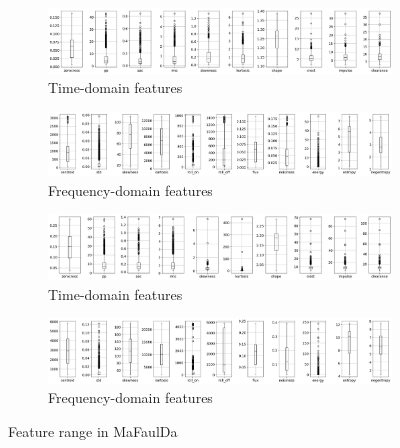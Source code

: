 \begin{figure}[h]
    \centering
    \begin{subfigure}[b]{0.48\textwidth}
        \includegraphics[width=\textwidth]{assets/results/feature-values/features-TD-dim1-A.png}
        \caption{Time-domain features}
    \end{subfigure}
    \hfill
    \begin{subfigure}[b]{0.48\textwidth}
        \includegraphics[width=\textwidth]{assets/results/feature-values/features-FD-dim1-A.png}
        \caption{Frequency-domain features}
    \end{subfigure}
    \begin{subfigure}[b]{0.48\textwidth}
        \includegraphics[width=\textwidth]{assets/results/feature-values/features-TD-dim3-A.png}
        \caption{Time-domain features}
    \end{subfigure}
    \hfill
    \begin{subfigure}[b]{0.48\textwidth}
        \includegraphics[width=\textwidth]{assets/results/feature-values/features-FD-dim3-A.png}
        \caption{Frequency-domain features}
    \end{subfigure}
    \caption{Feature range in MaFaulDa}
\end{figure}

